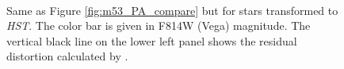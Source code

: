 \documentclass[]{spie}  %
\begin{document}
\begin{figure}[!h]
  \centering
  \\
  \hspace{-1cm}
  \caption{Same as Figure \ref{fig:m53_PA_compare} but for stars transformed to \textit{HST}. The color bar is given in F814W (Vega) magnitude. The vertical black line on the lower left panel shows the residual distortion calculated by \cite{service:2016a}.} \label{fig:m53_PA_compare_hst}
\end{figure}
\end{document}
